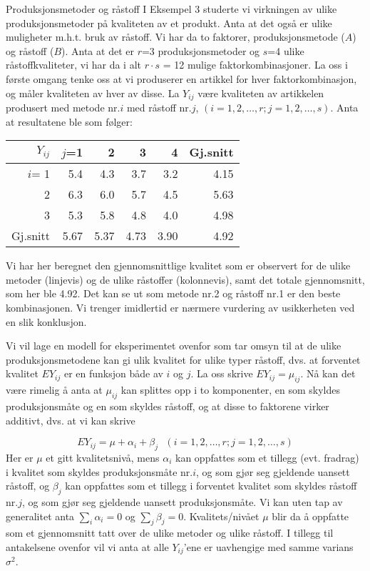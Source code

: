 \begin{eksempel}{Produksjonsmetoder og råstoff}
I Eksempel 3 studerte vi virkningen av ulike produksjonsmetoder på
kvali\-teten av et produkt.  Anta at det også er ulike muligheter
m.h.t. bruk av råstoff.  Vi har da to faktorer, produksjonsmetode ($A$)
og råstoff ($B$).  Anta at det er $r$=3 produksjonsmetoder og $s$=4 
ulike råstoffkvaliteter, vi har da i alt $r\cdot s$ = 12 mulige
faktorkombinasjoner.  La oss i første omgang tenke oss at vi
produserer en artikkel for hver faktorkombinasjon, og måler 
kvaliteten av hver av disse.  La $Y_{ij}$ være kvaliteten av 
artikkelen produsert med metode nr.$i$ med råstoff 
nr.$j$, $(i=1, 2, \ldots, r; j=1, 2, \ldots, s)$.  Anta at resultatene
ble som følger:

\begin{tabular}{|r|rrrr|r|} \hline
$Y_{ij}$  &   $j$=1    &    2    &    3    &    4    &   Gj.snitt \\ \hline    
$i$= 1    &     5.4    &   4.3   &   3.7   &   3.2   &       4.15 \\
     2    &     6.3    &   6.0   &   5.7   &   4.5   &       5.63 \\ 
     3    &     5.3    &   5.8   &   4.8   &   4.0   &       4.98 \\ \hline
Gj.snitt  &     5.67   &   5.37  &   4.73  &   3.90  &       4.92 \\ \hline
\end{tabular}
\end{eksempel}%
Vi har her beregnet den gjennomsnittlige kvalitet som er observert
for de ulike metoder (linjevis) og de ulike råstoffer (kolonnevis),
samt det totale gjennomsnitt, som her ble 4.92.  Det kan se ut som 
metode nr.2 og råstoff nr.1 er den beste kombinasjonen.  Vi trenger
imidlertid er nærmere vurdering av usikkerheten ved en slik 
konklusjon.

Vi vil lage en modell for eksperimentet ovenfor som tar omsyn til at
de ulike produksjonsmetodene kan gi ulik kvalitet for ulike typer 
råstoff, dvs. at forventet kvalitet $EY_{ij}$ er en funksjon både
av $i$ og $j$.  La oss skrive $EY_{ij} = \mu_{ij}$.  Nå kan det
være rimelig å anta at $\mu_{ij}$ kan splittes opp i to
komponenter, en som skyldes produksjonsmåte og en som skyldes
råstoff, og at disse to faktorene virker additivt, dvs. at vi kan skrive

\[ EY_{ij}=\mu +{\alpha}_i+{\beta}_j \mbox{\ \ \ }
                   (i = 1, 2, \ldots , r; j = 1, 2, \ldots ,s)\]
Her er $\mu$ et gitt kvalitetsnivå, mens ${\alpha}_i$ kan 
oppfattes som et tillegg (evt. fradrag) i kvalitet som skyldes 
produksjonsmåte nr.$i$, og som gjør seg gjel\-dende uansett råstoff,
og ${\beta}_j$ kan oppfattes som et tillegg i forventet kvalitet som 
skyldes råstoff nr.$j$, og som gjør seg gjeldende uansett 
produksjonsmåte.  Vi kan uten tap av generalitet anta 
$\sum_i{\alpha}_i = 0$ og $\sum_j{\beta}_j = 0$.  Kvalitets/nivået
$\mu$ blir da å oppfatte som et gjennomsnitt tatt over de ulike 
metoder og ulike råstoff.  I tillegg til antakelsene ovenfor vil
vi anta at alle $Y_{ij}$'ene er uavhengige med samme varians ${\sigma}^2$.

